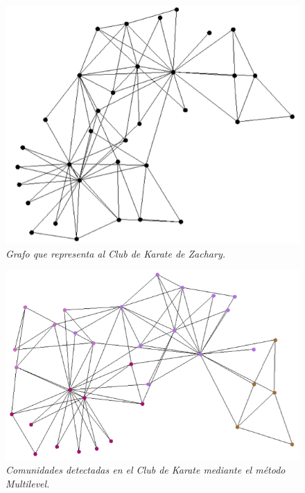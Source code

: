 \begin{figure}
  \centering
  \includegraphics[scale=.6]{images/Figura3-2}
  \caption{\em Grafo que representa al Club de Karate de Zachary.}
  \label{fig:serv-im2}
\end{figure}

\begin{figure}[H]
  \centering
  \includegraphics[scale=.6]{images/Figura3-3}
  \caption{\em Comunidades detectadas en el Club de Karate mediante el método \textit{\textit{Multilevel}}.}
  \label{fig:serv-im3}
\end{figure}

